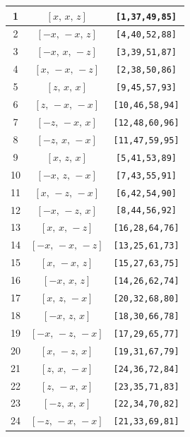\documentclass[fleqn,8pt]{jsarticle}
\begin{document}
\begin{longtable}{ccc}
1 & $\left[ x,\, x,\, z \right]$ & {\tt [1,37,49,85]} \\ \hline
2 & $\left[ - x,\, - x,\, z \right]$ & {\tt [4,40,52,88]} \\ \hline
3 & $\left[ - x,\, x,\, - z \right]$ & {\tt [3,39,51,87]} \\ \hline
4 & $\left[ x,\, - x,\, - z \right]$ & {\tt [2,38,50,86]} \\ \hline
5 & $\left[ z,\, x,\, x \right]$ & {\tt [9,45,57,93]} \\ \hline
6 & $\left[ z,\, - x,\, - x \right]$ & {\tt [10,46,58,94]} \\ \hline
7 & $\left[ - z,\, - x,\, x \right]$ & {\tt [12,48,60,96]} \\ \hline
8 & $\left[ - z,\, x,\, - x \right]$ & {\tt [11,47,59,95]} \\ \hline
9 & $\left[ x,\, z,\, x \right]$ & {\tt [5,41,53,89]} \\ \hline
10 & $\left[ - x,\, z,\, - x \right]$ & {\tt [7,43,55,91]} \\ \hline
11 & $\left[ x,\, - z,\, - x \right]$ & {\tt [6,42,54,90]} \\ \hline
12 & $\left[ - x,\, - z,\, x \right]$ & {\tt [8,44,56,92]} \\ \hline
13 & $\left[ x,\, x,\, - z \right]$ & {\tt [16,28,64,76]} \\ \hline
14 & $\left[ - x,\, - x,\, - z \right]$ & {\tt [13,25,61,73]} \\ \hline
15 & $\left[ x,\, - x,\, z \right]$ & {\tt [15,27,63,75]} \\ \hline
16 & $\left[ - x,\, x,\, z \right]$ & {\tt [14,26,62,74]} \\ \hline
17 & $\left[ x,\, z,\, - x \right]$ & {\tt [20,32,68,80]} \\ \hline
18 & $\left[ - x,\, z,\, x \right]$ & {\tt [18,30,66,78]} \\ \hline
19 & $\left[ - x,\, - z,\, - x \right]$ & {\tt [17,29,65,77]} \\ \hline
20 & $\left[ x,\, - z,\, x \right]$ & {\tt [19,31,67,79]} \\ \hline
21 & $\left[ z,\, x,\, - x \right]$ & {\tt [24,36,72,84]} \\ \hline
22 & $\left[ z,\, - x,\, x \right]$ & {\tt [23,35,71,83]} \\ \hline
23 & $\left[ - z,\, x,\, x \right]$ & {\tt [22,34,70,82]} \\ \hline
24 & $\left[ - z,\, - x,\, - x \right]$ & {\tt [21,33,69,81]} \\
\end{longtable}
\end{document}
